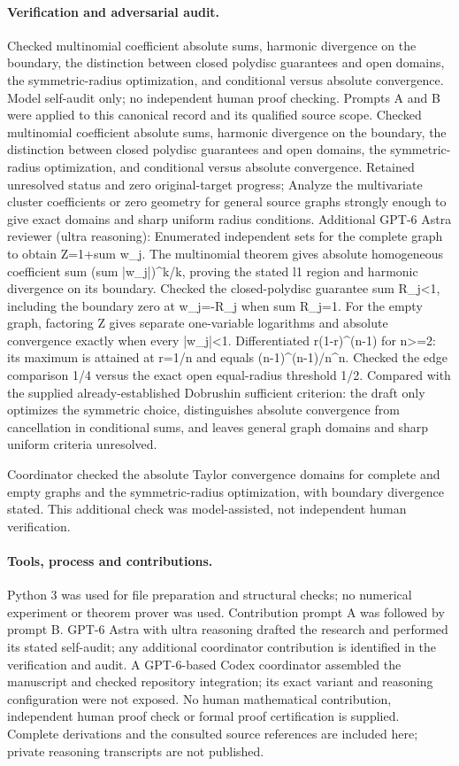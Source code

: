 \documentclass[11pt]{article}
\begin{document}
\paragraph{Verification and adversarial audit.}
Checked multinomial coefficient absolute sums, harmonic divergence on the boundary, the distinction between closed polydisc guarantees and open domains, the symmetric-radius optimization, and conditional versus absolute convergence. Model self-audit only; no independent human proof checking. Prompts A and B were applied to this canonical record and its qualified source scope. Checked multinomial coefficient absolute sums, harmonic divergence on the boundary, the distinction between closed polydisc guarantees and open domains, the symmetric-radius optimization, and conditional versus absolute convergence. Retained unresolved status and zero original-target progress; Analyze the multivariate cluster coefficients or zero geometry for general source graphs strongly enough to give exact domains and sharp uniform radius conditions. Additional GPT-6 Astra reviewer (ultra reasoning): Enumerated independent sets for the complete graph to obtain Z=1+sum w\_j. The multinomial theorem gives absolute homogeneous coefficient sum (sum |w\_j|)\textasciicircum{}k/k, proving the stated l1 region and harmonic divergence on its boundary. Checked the closed-polydisc guarantee sum R\_j<1, including the boundary zero at w\_j=-R\_j when sum R\_j=1. For the empty graph, factoring Z gives separate one-variable logarithms and absolute convergence exactly when every |w\_j|<1. Differentiated r(1-r)\textasciicircum{}(n-1) for n>=2: its maximum is attained at r=1/n and equals (n-1)\textasciicircum{}(n-1)/n\textasciicircum{}n. Checked the edge comparison 1/4 versus the exact open equal-radius threshold 1/2. Compared with the supplied already-established Dobrushin sufficient criterion: the draft only optimizes the symmetric choice, distinguishes absolute convergence from cancellation in conditional sums, and leaves general graph domains and sharp uniform criteria unresolved.

Coordinator checked the absolute Taylor convergence domains for complete and empty graphs and the symmetric-radius optimization, with boundary divergence stated. This additional check was model-assisted, not independent human verification.

\paragraph{Tools, process and contributions.}
Python 3 was used for file preparation and structural checks; no numerical experiment or theorem prover was used. Contribution prompt A was followed by prompt B. GPT-6 Astra with ultra reasoning drafted the research and performed its stated self-audit; any additional coordinator contribution is identified in the verification and audit. A GPT-6-based Codex coordinator assembled the manuscript and checked repository integration; its exact variant and reasoning configuration were not exposed. No human mathematical contribution, independent human proof check or formal proof certification is supplied. Complete derivations and the consulted source references are included here; private reasoning transcripts are not published.
\end{document}
